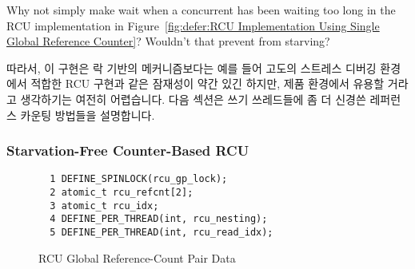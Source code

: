 	Why not simply make  wait when a concurrent
	 has been waiting too long in
	the RCU implementation in
	Figure~\ref{fig:defer:RCU Implementation Using Single Global Reference Counter}?
	Wouldn't that prevent  from starving?
	\fi
{} \QuickQuizEnd

따라서, 이 구현은 락 기반의 메커니즘보다는 예를 들어 고도의 스트레스 디버깅
환경에서 적합한 RCU 구현과 같은 잠재성이 약간 있긴 하지만, 제품 환경에서 유용할
거라고 생각하기는 여전히 어렵습니다.
다음 섹션은 쓰기 쓰레드들에 좀 더 신경쓴 레퍼런스 카운팅 방법들을 설명합니다.
\iffalse

Therefore, it is still hard to imagine this implementation being useful
in a production setting, though it has a bit more potential
than the lock-based mechanism, for example, as an RCU implementation
suitable for a high-stress debugging environment.
The next section describes a variation on the reference-counting
scheme that is more favorable to writers.
\fi

\subsubsection{Starvation-Free Counter-Based RCU}
\label{defer:Starvation-Free Counter-Based RCU}

\begin{figure}[tbp]
{ \scriptsize
\begin{verbatim}
  1 DEFINE_SPINLOCK(rcu_gp_lock);
  2 atomic_t rcu_refcnt[2];
  3 atomic_t rcu_idx;
  4 DEFINE_PER_THREAD(int, rcu_nesting);
  5 DEFINE_PER_THREAD(int, rcu_read_idx);
\end{verbatim}
}
\caption{RCU Global Reference-Count Pair Data}
\label{fig:defer:RCU Global Reference-Count Pair Data}
\end{figure}

